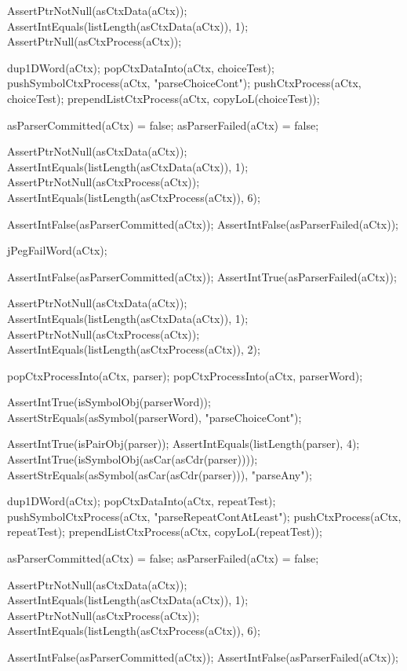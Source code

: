  AssertPtrNotNull(asCtxData(aCtx));
  AssertIntEquals(listLength(asCtxData(aCtx)), 1);
  AssertPtrNull(asCtxProcess(aCtx));
\stopCTest
\stopTestCase

\startCTest  
  dup1DWord(aCtx);
  popCtxDataInto(aCtx, choiceTest);
  pushSymbolCtxProcess(aCtx, "parseChoiceCont");
  pushCtxProcess(aCtx, choiceTest);
  prependListCtxProcess(aCtx, copyLoL(choiceTest));
  
  asParserCommitted(aCtx) = false;
  asParserFailed(aCtx) = false;
  
  AssertPtrNotNull(asCtxData(aCtx));
  AssertIntEquals(listLength(asCtxData(aCtx)), 1);
  AssertPtrNotNull(asCtxProcess(aCtx));
  AssertIntEquals(listLength(asCtxProcess(aCtx)), 6);
  
  AssertIntFalse(asParserCommitted(aCtx));
  AssertIntFalse(asParserFailed(aCtx));
  
  jPegFailWord(aCtx);
  
  AssertIntFalse(asParserCommitted(aCtx));
  AssertIntTrue(asParserFailed(aCtx));
  
  AssertPtrNotNull(asCtxData(aCtx));
  AssertIntEquals(listLength(asCtxData(aCtx)), 1);
  AssertPtrNotNull(asCtxProcess(aCtx));
  AssertIntEquals(listLength(asCtxProcess(aCtx)), 2);
  
  popCtxProcessInto(aCtx, parser);
  popCtxProcessInto(aCtx, parserWord);
  
  AssertIntTrue(isSymbolObj(parserWord));
  AssertStrEquals(asSymbol(parserWord), "parseChoiceCont");
  
  AssertIntTrue(isPairObj(parser));
  AssertIntEquals(listLength(parser), 4);
  AssertIntTrue(isSymbolObj(asCar(asCdr(parser))));
  AssertStrEquals(asSymbol(asCar(asCdr(parser))), "parseAny");
\stopCTest
\stopTestCase

\startCTest
  dup1DWord(aCtx);
  popCtxDataInto(aCtx, repeatTest);
  pushSymbolCtxProcess(aCtx, "parseRepeatContAtLeast");
  pushCtxProcess(aCtx, repeatTest);
  prependListCtxProcess(aCtx, copyLoL(repeatTest));
  
  asParserCommitted(aCtx) = false;
  asParserFailed(aCtx) = false;
  
  AssertPtrNotNull(asCtxData(aCtx));
  AssertIntEquals(listLength(asCtxData(aCtx)), 1);
  AssertPtrNotNull(asCtxProcess(aCtx));
  AssertIntEquals(listLength(asCtxProcess(aCtx)), 6);
  
  AssertIntFalse(asParserCommitted(aCtx));
  AssertIntFalse(asParserFailed(aCtx));
  
